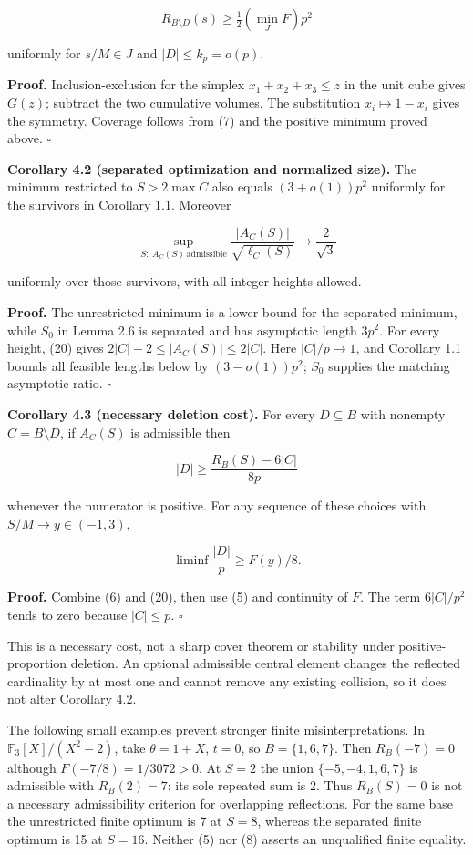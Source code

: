 \documentclass[11pt,a4paper]{article}
\begin{document}
\[R_{B\setminus D}(s)\ge\tfrac12(\min_J F)p^2\]

uniformly for \(s/M\in J\) and \(|D|\le k_p=o(p)\).

\textbf{Proof.} Inclusion-exclusion for the simplex \(x_1+x_2+x_3\le z\) in the unit cube gives \(G(z)\); subtract the two cumulative volumes. The substitution \(x_i\mapsto1-x_i\) gives the symmetry. Coverage follows from (7) and the positive minimum proved above. \hfill\(\square\)

\textbf{Corollary 4.2 (separated optimization and normalized size).} The minimum restricted to \(S>2\max C\) also equals \((3+o(1))p^2\) uniformly for the survivors in Corollary 1.1. Moreover

\[\sup_{S:\ A_C(S)\,\mathrm{admissible}}
\frac{|A_C(S)|}{\sqrt{\ell_C(S)}}\longrightarrow\frac2{\sqrt3}\]

uniformly over those survivors, with all integer heights allowed.

\textbf{Proof.} The unrestricted minimum is a lower bound for the separated minimum, while \(S_0\) in Lemma 2.6 is separated and has asymptotic length \(3p^2\). For every height, (20) gives \(2|C|-2\le|A_C(S)|\le2|C|\). Here \(|C|/p\to1\), and Corollary 1.1 bounds all feasible lengths below by \((3-o(1))p^2\); \(S_0\) supplies the matching asymptotic ratio. \hfill\(\square\)

\textbf{Corollary 4.3 (necessary deletion cost).} For every \(D\subseteq B\) with nonempty \(C=B\setminus D\), if \(A_C(S)\) is admissible then

\[|D|\ge\frac{R_B(S)-6|C|}{8p}
\tag{27}\]

whenever the numerator is positive. For any sequence of these choices with \(S/M\to y\in(-1,3)\),

\[\liminf\frac{|D|}{p}\ge F(y)/8.\]

\textbf{Proof.} Combine (6) and (20), then use (5) and continuity of \(F\). The term \(6|C|/p^2\) tends to zero because \(|C|\le p\). \hfill\(\square\)

This is a necessary cost, not a sharp cover theorem or stability under positive-proportion deletion. An optional admissible central element changes the reflected cardinality by at most one and cannot remove any existing collision, so it does not alter Corollary 4.2.

The following small examples prevent stronger finite misinterpretations. In \(\mathbb F_3[X]/(X^2-2)\), take \(\theta=1+X\), \(t=0\), so \(B=\{1,6,7\}\). Then \(R_B(-7)=0\) although \(F(-7/8)=1/3072>0\). At \(S=2\) the union \(\{-5,-4,1,6,7\}\) is admissible with \(R_B(2)=7\): its sole repeated sum is 2. Thus \(R_B(S)=0\) is not a necessary admissibility criterion for overlapping reflections. For the same base the unrestricted finite optimum is 7 at \(S=8\), whereas the separated finite optimum is 15 at \(S=16\). Neither (5) nor (8) asserts an unqualified finite equality.
\end{document}
